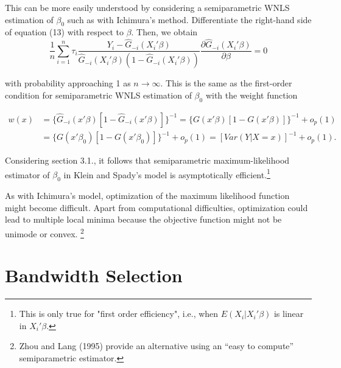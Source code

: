 \documentclass[a4paper]{article}
\begin{document}

This can be more easily understood by considering a semiparametric WNLS estimation of $\beta_0$ such as with Ichimura's method. Differentiate the right-hand side of equation (13) with respect to $\beta$. Then, we obtain
\begin{equation}
\frac{1}{n} \sum_{i=1}^n \tau_i \frac{Y_i - \hat{G}_{-i}(X_i'\beta)}{\hat{G}_{-i}(X_i'\beta)(1 - \hat{G}_{-i}(X_i'\beta))} \frac{\partial\hat{G}_{-i}(X_i'\beta)}{\partial \beta} = 0
\end{equation} 

with probability approaching 1 as $n \rightarrow \infty$. This is the same as the first-order condition for semiparametric WNLS estimation of $\beta_0$ with the weight function

\begin{align*}
w(x) & = \{ \hat{G}_{-i}(x'\beta)[ 1 - \hat{G}_{-i}(x'\beta)]\}^{-1} = \{ G(x'\beta)[ 1 - G(x'\beta)]\}^{-1} + o_p(1) \\
     & = \{ G(x'\beta_0)[ 1 - G(x'\beta_0)]\}^{-1} + o_p(1) = [Var(Y|X = x)]^{-1} + o_p(1).
\end{align*}


Considering section 3.1., it follows that semiparametric maximum-likelihood estimator of $\beta_0$ in Klein and Spady's model is asymptotically efficient.\footnote{This is only true for "first order efficiency", i.e., when $E(X_i|X_i'\beta)$ is linear in $X_i'\beta$.}

As with Ichimura's model, optimization of the maximum likelihood function might become difficult. Apart from computational difficulties, optimization could lead to multiple local minima because the objective function might not be unimode or convex. \footnote{Zhou and Lang (1995) provide an alternative using an ``easy to compute'' semiparametric estimator.}

\section{Bandwidth Selection} %
\label{sec:Bandwidth Selection}


\newpage 


\end{document}
